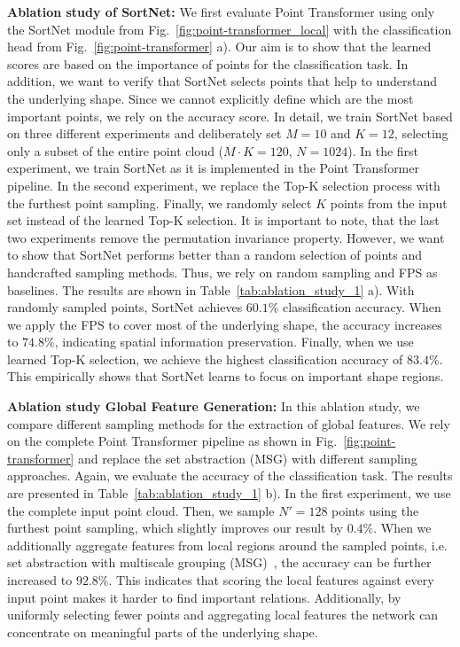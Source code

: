 \documentclass{ieeeaccess}
\begin{document}
\textbf{Ablation study of SortNet:}
We first evaluate Point Transformer using only the SortNet module from Fig.~\ref{fig:point-transformer_local} with the classification head from Fig.~\ref{fig:point-transformer} a). Our aim is to show that the learned scores are based on the importance of points for the classification task. In addition, we want to verify that SortNet selects points that help to understand the underlying shape. Since we cannot explicitly define which are the most important points, we rely on the accuracy score.
In detail, we train SortNet based on three different experiments and deliberately set $M=10$ and $K=12$, selecting only a subset of the entire point cloud ($M\cdot K = 120$, $N = 1024$).
In the first experiment, we train SortNet as it is implemented in the Point Transformer pipeline. 
In the second experiment, we replace the Top-K selection process with the furthest point sampling.
Finally, we randomly select $K$ points from the input set instead of the learned Top-K selection. It is important to note, that the last two experiments remove the permutation invariance property. However, we want to show that SortNet performs better than a random selection of points and handcrafted sampling methods. Thus, we rely on random sampling and FPS as baselines.
The results are shown in Table~\ref{tab:ablation_study_1} a). With randomly sampled points, SortNet achieves $60.1\%$ classification accuracy. When we apply the FPS to cover most of the underlying shape, the accuracy increases to $74.8\%$, indicating  spatial information preservation. Finally, when we use learned Top-K selection, we achieve the highest classification accuracy of $83.4\%$. This empirically shows that SortNet learns to focus on important shape regions.


\textbf{Ablation study Global Feature Generation:}
In this ablation study, we compare different sampling methods for the extraction of global features. We rely on the complete Point Transformer pipeline as shown in Fig.~\ref{fig:point-transformer} and replace the set abstraction (MSG) with different sampling approaches.
Again, we evaluate the accuracy of the classification task. The results are presented in Table~\ref{tab:ablation_study_1} b). In the first experiment, we use the complete input point cloud. Then, we sample $N'=128$ points using the furthest point sampling, which slightly improves our result by $0.4\%$. When we additionally aggregate features from local regions around the sampled points, i.e. set abstraction with multiscale grouping (MSG)~\cite{qi2017pointnet++}, the accuracy can be further increased to $92.8\%$. 
This indicates that scoring the local features against every input point makes it harder to find important relations. Additionally, by uniformly selecting fewer points and aggregating local features the network can concentrate on meaningful parts of the underlying shape.
\end{document}
